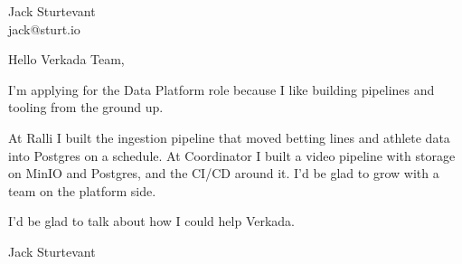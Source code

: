 \documentclass[11pt]{article}
\begin{document}
\raggedright

{\namefont\fontsize{20pt}{24pt}\selectfont Jack Sturtevant}\\[-0.3em]
jack@sturt.io

\vspace{1.2em}

Hello Verkada Team,

I'm applying for the Data Platform role because I like building pipelines and tooling from the ground up.

At Ralli I built the ingestion pipeline that moved betting lines and athlete data into Postgres on a schedule. At Coordinator I built a video pipeline with storage on MinIO and Postgres, and the CI/CD around it. I'd be glad to grow with a team on the platform side.

I'd be glad to talk about how I could help Verkada.

\vspace{0.6em}
Jack Sturtevant
\end{document}
